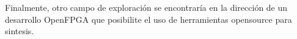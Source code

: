 Finalmente, otro campo de exploración se encontraría en la dirección de un desarrollo OpenFPGA que posibilite el uso de herramientas opensource para sintesis. 



%
%
%	 
%
%
